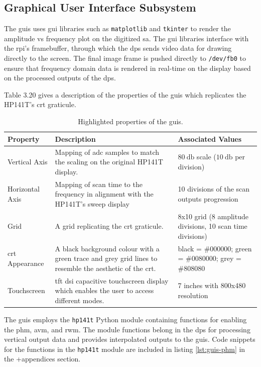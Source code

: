 \documentclass[class=report,11pt,crop=false]{standalone}
\begin{document}
	\subsection{Graphical User Interface Subsystem}
	
	The \acrshort{guis} uses \acrshort{gui} libraries such as \texttt{matplotlib} and \texttt{tkinter} to render the amplitude vs frequency plot on the digitized \acrshort{sa}. The \acrshort{gui} libraries interface with the \acrshort{rpi}'s framebuffer, through which the \acrshort{dps} sends video data for drawing directly to the screen. The final image frame is pushed directly to \texttt{/dev/fb0} to ensure that frequency domain data is rendered in real-time on the display based on the processed outputs of the \acrshort{dps}.
	
	Table 3.20 gives a description of the properties of the \acrshort{guis} which replicates the HP141T's \acrshort{crt} graticule. 
	\begin{table}[ht!]
		\centering
		\label{tab:guis-properties}
		\begin{tabular}{|m{5em}|m{15em}|m{10em}|}
			\hline
			\textbf{Property}	& \textbf{Description}	& \textbf{Associated Values}\\
			\hline
			Vertical Axis	& Mapping of \acrshort{adc} samples to match the scaling on the original HP141T display.	&  $\SI{80}{\decibel}$ scale ($\SI{10}{\decibel}$ per division)\\
			\hline
			Horizontal Axis & Mapping of scan time to the frequency in alignment with the HP141T's sweep display & 10 divisions of the scan outputs progression\\
			\hline
			Grid	& A grid replicating the \acrshort{crt} graticule. & 8x10 grid (8 amplitude divisions, 10 scan time divisions)\\
			\hline
			\acrshort{crt} Appearance & A black background colour with a green trace and grey grid lines to resemble the aesthetic of the \acrshort{crt}. & black = $\#000000$; green = $\#0080000$; grey = $\#808080$\\
			\hline
			Touchscreen	& \acrshort{tft} \acrshort{dsi} capacitive touchscreen display which enables the user to access different modes. & 7 inches with 800x480 resolution\\
			\hline
		\end{tabular}
		\caption{Highlighted properties of the \acrshort{guis}.}
	\end{table}
	
	The \acrshort{guis} employs the \texttt{hp141t} Python module containing functions for enabling the \acrshort{phm}, \acrshort{avm}, and \acrshort{rwm}. The module functions belong in the \acrshort{dps} for processing vertical output data and provides interpolated outputs to the \acrshort{guis}. Code snippets for the functions in the \texttt{hp141t} module are included in listing \ref{lst:guis-phm} in the +appendices section.
		
\end{document}
